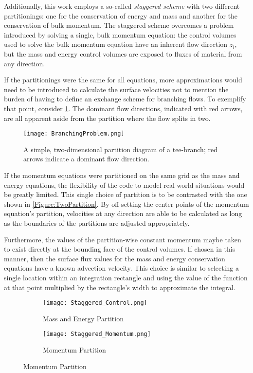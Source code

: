 Additionally, this work employs a so-called \textit{staggered scheme} with two different partitionings: one for the conservation of energy and mass and another for the conservation of bulk momentum.
The staggered scheme overcomes a problem introduced by solving a single, bulk momentum equation: the control volumes used to solve the bulk momentum equation have an inherent flow direction $z_i$, but the mass and energy control volumes are exposed to fluxes of material from any direction.


If the partitionings were the same for all equations, more approximations would need to be introduced to calculate the surface velocities not to mention the burden of having to define an exchange scheme for branching flows.
To exemplify that point, consider \cref{Figure:Branching}.
The dominant flow directions, indicated with red arrows, are all apparent aside from the partition where the flow splits in two.
\begin{figure}[t]%
    \centering
    \caption{A simple, two-dimensional partition diagram of a tee-branch; red arrows indicate a dominant flow direction.}%
    \label{Figure:Branching}%
    \texttt{[image: BranchingProblem.png]}%
\end{figure}
If the momentum equations were partitioned on the same grid as the mass and energy equations, the flexibility of the code to model real world situations would be greatly limited.
This single choice of partition is to be contrasted with the one shown in \cref{Figure:TwoPartition}.
By off-setting the center points of the momentum equation's partition, velocities at any direction are able to be calculated as long as the boundaries of the partitions are adjusted appropriately.

Furthermore, the values of the partition-wise constant momentum maybe taken to exist directly at the bounding face of the control volumes.
If chosen in this manner, then the surface flux values for the mass and energy conservation equations have a known advection velocity.
This choice is similar to selecting a single location within an integration rectangle and using the value of the function at that point multiplied by the rectangle's width to approximate the integral.

\begin{figure}[b]%
    \caption{A staggered, two-dimensional diagram of a tee-branch.}
    \label{Figure:TwoPartition}
    \begin{subfigure}[t]{0.499\textwidth}%
        \centering
        \caption{Mass and Energy Partition}%
        \texttt{[image: Staggered\_Control.png]}%
    \end{subfigure}
    \begin{subfigure}[t]{0.499\textwidth}%
        \centering
        \caption{Momentum Partition}%
        \texttt{[image: Staggered\_Momentum.png]}%
    \end{subfigure}
\end{figure}





